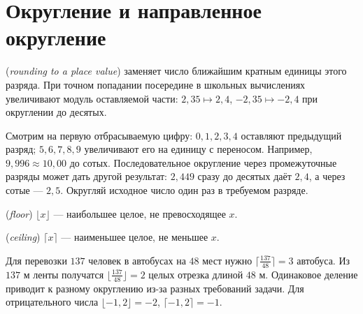 \section{Округление и направленное округление}
\begin{definition} (\emph{rounding to a place value}) заменяет число ближайшим кратным единицы этого разряда. При точном попадании посередине в школьных вычислениях увеличивают модуль оставляемой части: \(2{,}35\mapsto2{,}4\), \(-2{,}35\mapsto-2{,}4\) при округлении до десятых.\end{definition}
Смотрим на первую отбрасываемую цифру: \(0,1,2,3,4\) оставляют предыдущий разряд; \(5,6,7,8,9\) увеличивают его на единицу с переносом. Например, \(9{,}996\approx10{,}00\) до сотых. Последовательное округление через промежуточные разряды может дать другой результат: \(2{,}449\) сразу до десятых даёт \(2{,}4\), а через сотые --- \(2{,}5\). Округляй исходное число один раз в требуемом разряде.
\begin{definition} (\emph{floor}) \(\lfloor x\rfloor\) --- наибольшее целое, не превосходящее \(x\). \par{} (\emph{ceiling}) \(\lceil x\rceil\) --- наименьшее целое, не меньшее \(x\).\end{definition}
\begin{example}Для перевозки \(137\) человек в автобусах на \(48\) мест нужно \(\lceil\frac{137}{48}\rceil=3\) автобуса. Из \(137\) м ленты получатся \(\lfloor\frac{137}{48}\rfloor=2\) целых отрезка длиной \(48\) м. Одинаковое деление приводит к разному округлению из-за разных требований задачи. Для отрицательного числа \(\lfloor-1{,}2\rfloor=-2\), \(\lceil-1{,}2\rceil=-1\).\end{example}
